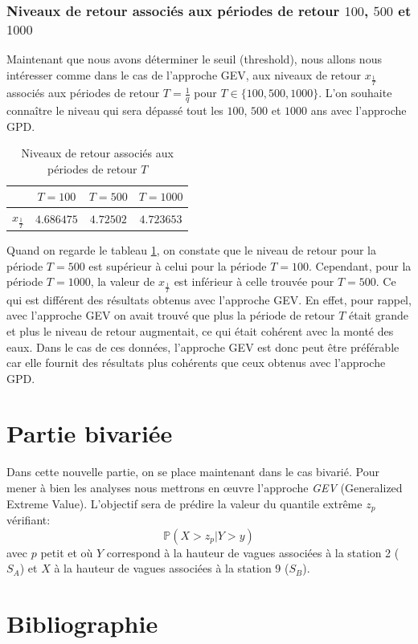\documentclass[a4paper,french,10pt]{article}
\begin{document}
\subsubsection{Niveaux de retour associés aux périodes de retour $100$, $500$ et $1000$}
Maintenant que nous avons déterminer le seuil (threshold), nous allons nous intéresser comme dans le cas de l'approche GEV, aux niveaux de retour $x_{\frac{1}{T}}$ associés aux périodes de retour $T = \frac{1}{q}$ pour $T \in \{100,500,1000\}$. L'on souhaite connaître le niveau qui sera dépassé tout les $100$, $500$ et $1000$ ans avec l'approche GPD.

\begin{table}[htp]
	\center
	\begin{tabular}{|c||c|c|c|}
		\hline
		\diagbox{Niveau de retour}{Périodes ou Années $T$} & $T = 100$ & $T = 500$ & $T = 1000$\\
		\hline
		$x_{\frac{1}{T}}$ & $4.686475$ & $4.72502$ & $4.723653$ \\
		\hline
	\end{tabular}
	\caption{Niveaux de retour associés aux périodes de retour $T$}
	\label{tab3}
\end{table}
Quand on regarde le tableau \ref{tab3}, on constate que le niveau de retour pour la période $T=500$ est supérieur à celui pour la période $T=100$. Cependant, pour la période $T=1000$, la valeur de $x_{\frac{1}{T}}$ est inférieur à celle trouvée pour $T = 500$. Ce qui est différent des résultats obtenus avec l'approche GEV. En effet, pour rappel, avec l'approche GEV on avait trouvé que plus la période de retour $T$ était grande et plus le niveau de retour augmentait, ce qui était cohérent avec la monté des eaux. Dans le cas de ces données, l'approche GEV est donc peut être préférable car elle fournit des résultats plus cohérents que ceux obtenus avec l'approche GPD.

\section{Partie bivariée}
Dans cette nouvelle partie, on se place maintenant dans le cas bivarié.
Pour mener à bien les analyses nous mettrons en œuvre l'approche \textit{GEV} (Generalized Extreme Value). L'objectif sera de prédire la valeur du quantile extrême $z_p$ vérifiant:
\[
	\mathbb{P}(X > z_p | Y > y)
\]
avec $p$ petit et où $Y$ correspond à la hauteur de vagues associées à la station 2 ($S_A$) et $X$ à la hauteur de vagues associées à la station 9 ($S_B$).
\section{Bibliographie}
\end{document}
